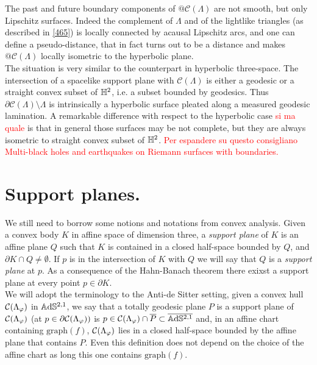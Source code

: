 \begin{observation}\label{467}
The past and future boundary components of $@\mathcal{C}(\Lambda)$ are not smooth, but only Lipschitz surfaces. Indeed the complement of $\Lambda$ and of the lightlike triangles (as described in \ref{465}) is locally connected by acausal Lipschitz arcs, and one can define a pseudo-distance, that in fact turns out to be a distance and makes $@\mathcal{C}(\Lambda)$ locally isometric to the hyperbolic plane. \\
The situation is very similar to the counterpart in hyperbolic three-space. The intersection of a spacelike support plane with $\mathcal{C}(\Lambda)$ is either a geodesic or a straight convex subset of $\mathbb{H}^2$, i.e. a subset bounded by geodesics. Thus $\partial\mathcal{C}(\Lambda)\setminus\Lambda$ is intrinsically a hyperbolic surface pleated along a measured geodesic lamination. A remarkable difference with respect to the hyperbolic case \textcolor{red}{si ma quale} is that in general those surfaces may be not complete, but they are always isometric to straight convex subset of $\mathbb{H}^2$. \textcolor{red}{Per espandere su questo consigliano Multi-black holes and earthquakes on Riemann surfaces with boundaries.}

\end{observation}

\section{Support planes.}\label{sectionplanes}
We still need to borrow some notions and notations from convex analysis. Given a convex body $K$ in affine space of dimension three, a \textit{support plane} of $K$ is an affine plane $Q$ such that $K$ is contained in a closed half-space bounded by $Q$, and $\partial K\cap Q\neq\emptyset.$ If $p$ is in the intersection of $K$ with $Q$ we will say that $Q$ is a \textit{support plane} at $p$. As a consequence of the Hahn-Banach theorem there exixst a support plane at every point $p\in\partial K.$ \\
We will adopt the terminology to the Anti-de Sitter setting, given a convex hull $\mathcal{C}(\Lambda_\varphi)$ in $\mathbb{A}\mathrm{d}\mathbb{S}^{2,1}$, we say that a totally geodesic plane $P$ is a support plane of $\mathcal{C}(\Lambda_\varphi)$ (at $p\in\partial\mathcal{C}(\Lambda_\varphi))$ is $p\in\mathcal{C}(\Lambda_\varphi)\cap \overline{P}\subset\overline{\mathbb{A}\mathrm{d}\mathbb{S}^{2,1}}$ and, in an affine chart containing $\text{graph}(f)$, $\mathcal{C}(\Lambda_\varphi)$ lies in a closed half-space bounded by the affine plane that contains $P$. Even this definition does not depend on the choice of the affine chart as long this one contains $\text{graph}(f)$.\\ 

